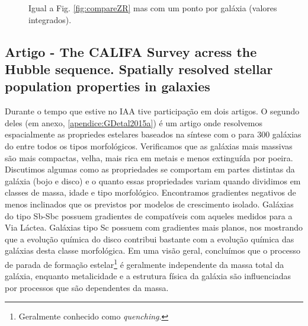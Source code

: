\begin{figure}
	\centering
	\caption[ vs $\log\ (O/H)$ - galáxias integradas]
	{Igual a Fig. \ref{fig:compareZR} mas com um ponto por galáxia (valores integrados).}
	\label{fig:compareZint}
\end{figure}

\subsection{Artigo - The CALIFA Survey acress the Hubble sequence. Spatially resolved stellar
population properties in galaxies}

Durante o tempo que estive no IAA tive participação em dois artigos. O segundo deles \citep[][GD15
daqui em diante]{GonzalezDelgado.etal.2015a} (em anexo, \ref{apendice:GDetal2015a}) é um artigo
onde resolvemos espacialmente as propriedes estelares baseados na síntese com o \starlight para 300
galáxias do \CAL entre todos os tipos morfológicos. Verificamos que as galáxias mais massivas são
mais compactas, velha, mais rica em metais e menos extinguída por poeira. Discutimos algumas como as
propriedades se comportam em partes distintas da galáxia (bojo e disco) e o quanto essas
propriedades variam quando dividimos em classes de massa, idade e tipo morfológico. Encontramos
gradientes negativos de  menos inclinados que os previstos por modelos de
crescimento isolado. Galáxias do tipo Sb-Sbc possuem gradientes de  compatíveis
com aqueles medidos para a Via Láctea. Galáxias tipo Sc possuem com gradientes mais planos, nos
mostrando que a evolução química do disco contribui bastante com a evolução química das galáxias
desta classe morfológica. Em uma visão geral, concluímos que o processo de parada de formação
estelar\footnote{Geralmente conhecido como {\em quenching}.} é geralmente independente da massa
total da galáxia, enquanto metalicidade e a estrutura física da galáxia são influenciadas por
processos que são dependentes da massa.

